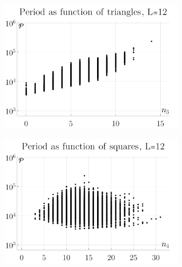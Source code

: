 \documentclass[12pt]{article}
\numberwithin{equation}{section}
\begin{document}
\begin{figure}[htb]
	\centering 
	\begin{subfigure}[b]{.32 \textwidth}
		\includegraphics[width=\linewidth]{figures/period_triangles}
		\subcaption{}
		\label{fig:period_triangles}
	\end{subfigure}
	\begin{subfigure}[b]{.32 \textwidth}
		\includegraphics[width=\linewidth]{figures/period_squares}
		\subcaption{}
		\label{fig:period_triangles_squares}
	\end{subfigure}
	\begin{subfigure}[b]{.32 \textwidth}

\end{subfigure}
\end{figure}
\end{document}
